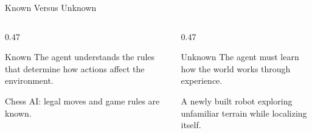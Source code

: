 \documentclass[aspectratio=169,10pt]{beamer}
\begin{document}
\begin{frame}{Known Versus Unknown}
  \begin{columns}[T,onlytextwidth]
    \begin{column}{0.47\textwidth}
      \begin{block}{Known}
        The agent understands the rules that determine how actions affect the environment.
      \end{block}
      \begin{exampleblockcp}
        Chess AI: legal moves and game rules are known.
      \end{exampleblockcp}
    \end{column}
    \begin{column}{0.47\textwidth}
      \begin{block}{Unknown}
        The agent must learn how the world works through experience.
      \end{block}
      \begin{exampleblockcp}
        A newly built robot exploring unfamiliar terrain while localizing itself.
      \end{exampleblockcp}
    \end{column}
  \end{columns}
\end{frame}
\end{document}
